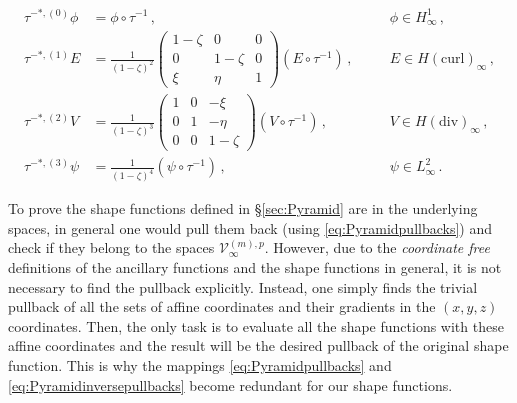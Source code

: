 \begin{equation}
\begin{alignedat}{3}
	\tau^{-*,(0)}\phi&=\phi\circ\tau^{-1}\,,\quad 
		&&\phi\in H_\infty^1\,,\\
	\tau^{-*,(1)}E&=\frac{1}{(1-\zeta)^2}\begin{pmatrix}1-\zeta&0&0\\0&1-\zeta&0\\\xi&\eta&1\end{pmatrix}(E\circ\tau^{-1})\,,\quad 
		&& E\in H(\mathrm{curl})_\infty\,,\\
	\tau^{-*,(2)}V&=\frac{1}{(1-\zeta)^3}\begin{pmatrix}1&0&-\xi\\0&1&-\eta\\0&0&1-\zeta\end{pmatrix}(V\circ\tau^{-1})\,,\quad 
		&& V\in H(\mathrm{div})_\infty\,,\\
	\tau^{-*,(3)}\psi&=\frac{1}{(1-\zeta)^4}(\psi\circ\tau^{-1})\,,\quad 
		&&\psi\in L_\infty^2\,.
\end{alignedat}
\label{eq:Pyramidinversepullbacks}
\end{equation}

To prove the shape functions defined in \S\ref{sec:Pyramid} are in the underlying spaces, in general one would pull them back (using \eqref{eq:Pyramidpullbacks}) and check if they belong to the spaces $\mathcal{V}_\infty^{(m),p}$.
However, due to the \textit{coordinate free} definitions of the ancillary functions and the shape functions in general, it is not necessary to find the pullback explicitly.
Instead, one simply finds the trivial pullback of all the sets of affine coordinates and their gradients in the $(x,y,z)$ coordinates.
Then, the only task is to evaluate all the shape functions with these affine coordinates and the result will be the desired pullback of the original shape function.
This is why the mappings \eqref{eq:Pyramidpullbacks} and \eqref{eq:Pyramidinversepullbacks} become redundant for our shape functions.

